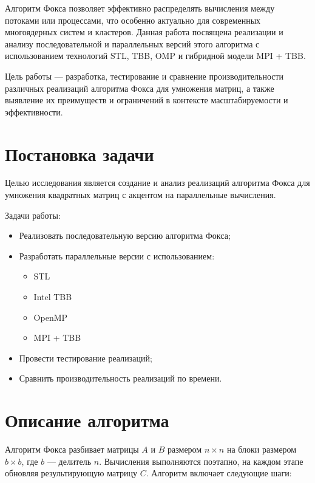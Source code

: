 \documentclass[12pt]{article}
\begin{document}
Алгоритм Фокса позволяет эффективно распределять вычисления между потоками или процессами, что особенно актуально для современных многоядерных систем и кластеров. Данная работа посвящена реализации и анализу последовательной и параллельных версий этого алгоритма с использованием технологий STL, TBB, OMP и гибридной модели MPI + TBB.

Цель работы — разработка, тестирование и сравнение производительности различных реализаций алгоритма Фокса для умножения матриц, а также выявление их преимуществ и ограничений в контексте масштабируемости и эффективности.

\section{Постановка задачи}

\hspace*{1.25em}Целью исследования является создание и анализ реализаций алгоритма Фокса для умножения квадратных матриц с акцентом на параллельные вычисления.

Задачи работы:
\begin{itemize}
    \item Реализовать последовательную версию алгоритма Фокса;
    \item Разработать параллельные версии с использованием:
    \begin{itemize}
        \item STL
        \item Intel TBB
        \item OpenMP
        \item MPI + TBB
    \end{itemize}
    \item Провести тестирование реализаций;
    \item Сравнить производительность реализаций по времени.
\end{itemize}

\section{Описание алгоритма}

Алгоритм Фокса разбивает матрицы $A$ и $B$ размером $n \times n$ на блоки размером $b \times b$, где $b$ — делитель $n$. Вычисления выполняются поэтапно, на каждом этапе обновляя результирующую матрицу $C$. Алгоритм включает следующие шаги:
\end{document}
